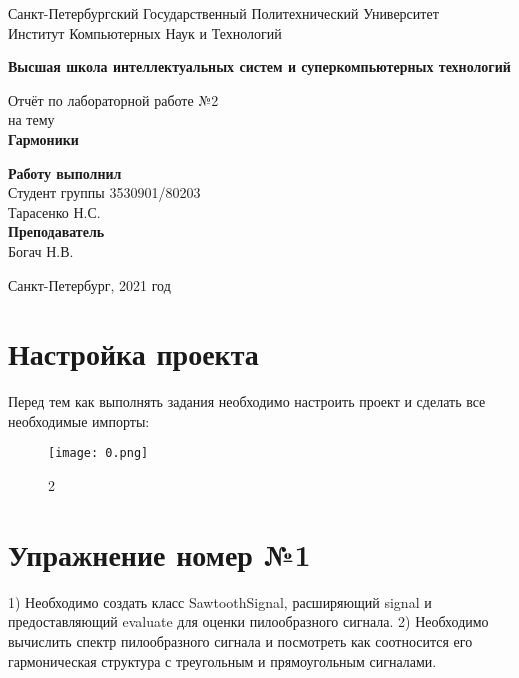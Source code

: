 \documentclass[10pt,a4paper,oneside]{article}
\begin{document}
\begin{titlepage}
\newpage
	\begin{center}
		\Large Санкт-Петербургский Государственный Политехнический Университет\\
		Институт Компьютерных Наук и Технологий\\
	\end{center}
	\begin{center}
		\large\textbf {Высшая школа интеллектуальных систем и суперкомпьютерных технологий}
	\end{center}
	
	\vspace{5em}
	\begin{center}
		\large{Отчёт по лабораторной работе №2 \\ на тему \\
		\textbf{Гармоники} }
	\end{center}
	
	\vspace{25em}
	\begin{flushright}
		\textbf{Работу выполнил\\}Студент группы 3530901/80203 \\ Тарасенко Н.С.\\
		\textbf{Преподаватель\\}Богач Н.В. 
	\end{flushright}
	
	\vspace{\fill}%
	\begin{center}
	Санкт-Петербург, 2021 год	
	\end{center}
\end{titlepage} %

\section{Настройка проекта}
Перед тем как выполнять задания необходимо настроить проект и сделать все необходимые импорты:

\begin{figure}[H]
        \centering
        \texttt{[image: 0.png]}
        \caption{2}
        \label{fig:first}
\end{figure}

\section{Упражнение номер №1}
1) Необходимо создать класс SawtoothSignal, расширяющий signal и предоставляющий evaluate для оценки пилообразного сигнала.
2) Необходимо вычислить спектр пилообразного сигнала и посмотреть как соотносится его гармоническая структура с треугольным и прямоугольным сигналами.
\end{document}
